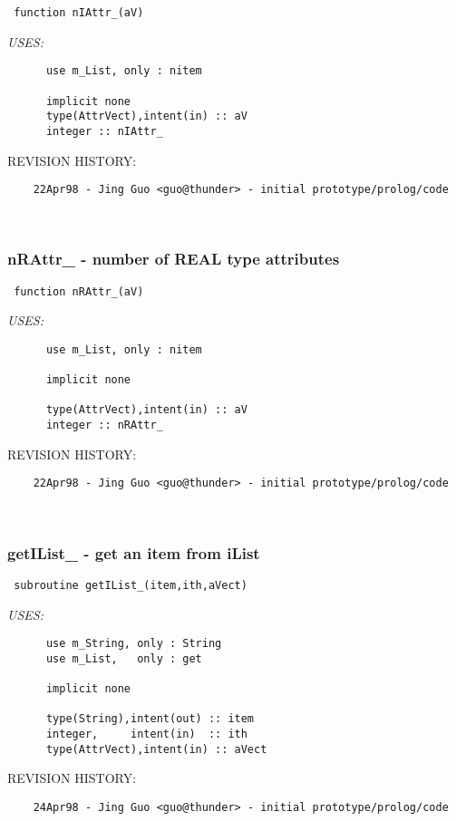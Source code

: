  
 
\begin{verbatim} 
 function nIAttr_(aV)\end{verbatim}{\em USES:}
\begin{verbatim}      use m_List, only : nitem
 
      implicit none
      type(AttrVect),intent(in) :: aV
      integer :: nIAttr_
 \end{verbatim}{\sf REVISION HISTORY:}
\begin{verbatim}  	22Apr98 - Jing Guo <guo@thunder> - initial prototype/prolog/code\end{verbatim}
 
 
\mbox{}\hrulefill\ 
 

 \subsubsection{nRAttr\_ - number of REAL type attributes}


 
 
\begin{verbatim} 
 function nRAttr_(aV)\end{verbatim}{\em USES:}
\begin{verbatim}      use m_List, only : nitem
 
      implicit none
 
      type(AttrVect),intent(in) :: aV
      integer :: nRAttr_
 \end{verbatim}{\sf REVISION HISTORY:}
\begin{verbatim}  	22Apr98 - Jing Guo <guo@thunder> - initial prototype/prolog/code\end{verbatim}
 
 
\mbox{}\hrulefill\ 
 

 \subsubsection{getIList\_ - get an item from iList}


 
 
\begin{verbatim} 
 subroutine getIList_(item,ith,aVect)\end{verbatim}{\em USES:}
\begin{verbatim}      use m_String, only : String
      use m_List,   only : get
 
      implicit none
 
      type(String),intent(out) :: item
      integer,     intent(in)  :: ith
      type(AttrVect),intent(in) :: aVect
 \end{verbatim}{\sf REVISION HISTORY:}
\begin{verbatim}  	24Apr98 - Jing Guo <guo@thunder> - initial prototype/prolog/code\end{verbatim}
 
